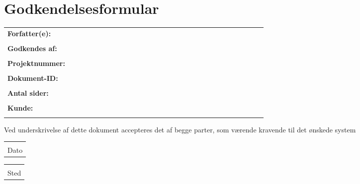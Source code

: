 \chapter*{Godkendelsesformular}

\begin{table}[h!]
	\begin{tabular}{|l|llllllllllllllllllllllllllll|}
		\hline
		\textbf{Forfatter(e):} &  &  &  &  &  &  &  &  &  &  &  &  &  &  &  &  &  &  &  &  &  &  &  &  &  &  &  &  \\
		&  &  &  &  &  &  &  &  &  &  &  &  &  &  &  &  &  &  &  &  &  &  &  &  &  &  &  &  \\
		\hline
		\textbf{Godkendes af:} &  &  &  &  &  &  &  &  &  &  &  &  &  &  &  &  &  &  &  &  &  &  &  &  &  &  &  &  \\
		&  &  &  &  &  &  &  &  &  &  &  &  &  &  &  &  &  &  &  &  &  &  &  &  &  &  &  &  \\
		\hline
		\textbf{Projektnummer:} &  &  &  &  &  &  &  &  &  &  &  &  &  &  &  &  &  &  &  &  &  &  &  &  &  &  &  &  \\
		&  &  &  &  &  &  &  &  &  &  &  &  &  &  &  &  &  &  &  &  &  &  &  &  &  &  &  &  \\
		\hline
		\textbf{Dokument-ID:} &  &  &  &  &  &  &  &  &  &  &  &  &  &  &  &  &  &  &  &  &  &  &  &  &  &  &  &  \\
		&  &  &  &  &  &  &  &  &  &  &  &  &  &  &  &  &  &  &  &  &  &  &  &  &  &  &  &  \\
		\hline
		\textbf{Antal sider:} &  &  &  &  &  &  &  &  &  &  &  &  &  &  &  &  &  &  &  &  &  &  &  &  &  &  &  &  \\
		&  &  &  &  &  &  &  &  &  &  &  &  &  &  &  &  &  &  &  &  &  &  &  &  &  &  &  &  \\
		\hline
		\textbf{Kunde:} &  &  &  &  &  &  &  &  &  &  &  &  &  &  &  &  &  &  &  &  &  &  &  &  &  &  &  &  \\
		&  &  &  &  &  &  &  &  &  &  &  &  &  &  &  &  &  &  &  &  &  &  &  &  &  &  &  & \\
		\hline
	\end{tabular}
\end{table}

\vspace{1 cm}
Ved underskrivelse af dette dokument accepteres det af begge parter, som værende kravende til det ønskede system
\vspace{1.5 cm}

\begin{table}[h!]
	\begin{tabular}{@{}p{2.5in}@{}}
		\hrulefill \\
		Dato 
	\end{tabular} \hfill
	\quad
	\begin{tabular}{@{}p{2.5in}@{}}
		\hrulefill \\
		Sted \\
	\end{tabular}
\end{table}

